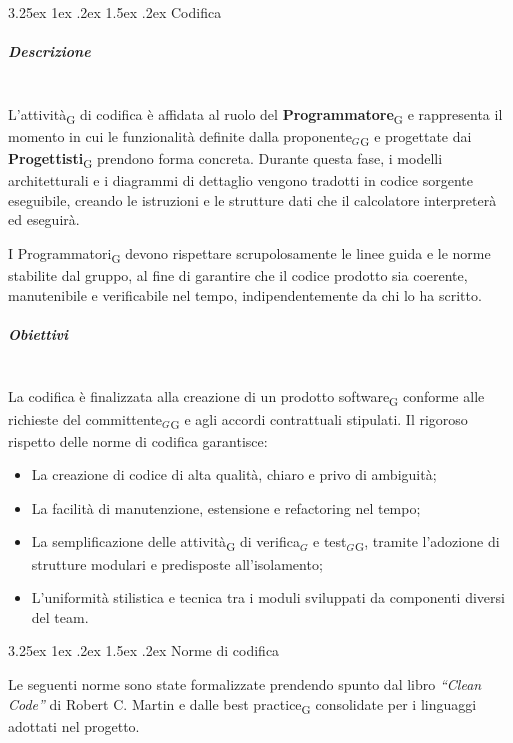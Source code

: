 \documentclass[a4paper, 10pt]{article}
\makeatletter
\renewcommand\paragraph{\@startsection{paragraph}{4}{\z@}%
  {3.25ex \@plus1ex \@minus .2ex}%
  {1.5ex \@plus .2ex}%
  {\normalfont\normalsize\bfseries}}
\makeatother
\begin{document}
\paragraph{Codifica}

\subparagraph{Descrizione}~\\

L'attività\textsubscript{G} di codifica è affidata al ruolo del \textbf{Programmatore}\textsubscript{G} e rappresenta il momento in cui le funzionalità definite dalla proponente$_G$\textsubscript{G} e progettate dai \textbf{Progettisti}\textsubscript{G} prendono forma concreta. Durante questa fase, i modelli architetturali e i diagrammi di dettaglio vengono tradotti in codice sorgente eseguibile, creando le istruzioni e le strutture dati che il calcolatore interpreterà ed eseguirà.

I Programmatori\textsubscript{G} devono rispettare scrupolosamente le linee guida e le norme stabilite dal gruppo, al fine di garantire che il codice prodotto sia coerente, manutenibile e verificabile nel tempo, indipendentemente da chi lo ha scritto.

\subparagraph{Obiettivi}~\\

La codifica è finalizzata alla creazione di un prodotto software\textsubscript{G} conforme alle richieste del committente$_G$\textsubscript{G} e agli accordi contrattuali stipulati. Il rigoroso rispetto delle norme di codifica garantisce:

\begin{itemize}
    \item La creazione di codice di alta qualità, chiaro e privo di ambiguità;
    \item La facilità di manutenzione, estensione e refactoring nel tempo;
    \item La semplificazione delle attività\textsubscript{G} di verifica$_G$ e test$_G$\textsubscript{G}, tramite l'adozione di strutture modulari e predisposte all'isolamento;
    \item L'uniformità stilistica e tecnica tra i moduli sviluppati da componenti diversi del team.
\end{itemize}

\paragraph{Norme di codifica}

Le seguenti norme sono state formalizzate prendendo spunto dal libro \textit{``Clean Code''} di Robert C. Martin e dalle best practice\textsubscript{G} consolidate per i linguaggi adottati nel progetto.
\end{document}
